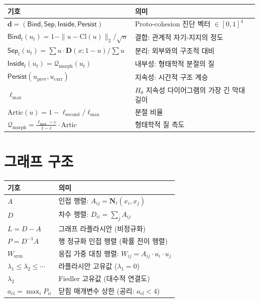 \begin{tabular}{lp{11cm}}
\hline
\textbf{기호} & \textbf{의미} \\
\hline
$\mathbf{d} = (\mathsf{Bind}, \mathsf{Sep}, \mathsf{Inside}, \mathsf{Persist})$ & Proto-cohesion 진단 벡터 $\in [0,1]^4$ \\[4pt]
$\mathsf{Bind}_t(u_t) = 1 - \|u - \mathrm{Cl}(u)\|_2 / \sqrt{n}$ & 결합: 관계적 자기-지지의 정도 \\[4pt]
$\mathsf{Sep}_t(u_t) = \sum u \cdot \mathbf{D}(x;1\!-\!u) / \sum u$ & 분리: 외부와의 구조적 대비 \\[4pt]
$\mathsf{Inside}_t(u_t) = \mathcal{Q}_{\mathrm{morph}}(u_t)$ & 내부성: 형태학적 분절의 질 \\[4pt]
$\mathsf{Persist}(u_{\mathrm{prev}}, u_{\mathrm{curr}})$ & 지속성: 시간적 구조 계승 \\[6pt]
$\ell_{\max}$ & $H_0$ 지속성 다이어그램의 가장 긴 막대 길이 \\
$\mathrm{Artic}(u) = 1 - \ell_{\mathrm{second}}/\ell_{\max}$ & 분절 비율 \\
$\mathcal{Q}_{\mathrm{morph}} = \frac{\ell_{\max} - c}{1 - c} \cdot \mathrm{Artic}$ & 형태학적 질 측도 \\
\hline
\end{tabular}


\section*{그래프 구조}

\begin{tabular}{lp{11cm}}
\hline
\textbf{기호} & \textbf{의미} \\
\hline
$A$ & 인접 행렬: $A_{ij} = \mathbf{N}_t(x_i, x_j)$ \\
$D$ & 차수 행렬: $D_{ii} = \sum_j A_{ij}$ \\
$L = D - A$ & 그래프 라플라시안 (비정규화) \\
$P = D^{-1}A$ & 행 정규화 인접 행렬 (확률 전이 행렬) \\
$W_{\mathrm{sym}}$ & 응집 가중 대칭 행렬: $W_{ij} = A_{ij} \cdot u_i \cdot u_j$ \\
$\lambda_1 \leq \lambda_2 \leq \cdots$ & 라플라시안 고유값 ($\lambda_1 = 0$) \\
$\lambda_2$ & Fiedler 고유값 (대수적 연결도) \\
$a_{\mathrm{cl}} = \max_i P_{ii}$ & 닫힘 매개변수 상한 (공리: $a_{\mathrm{cl}} < 4$) \\
\hline
\end{tabular}


